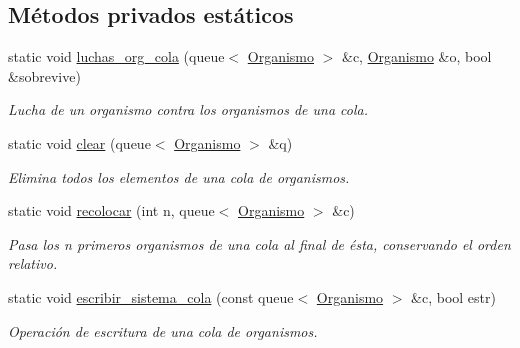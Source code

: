 \subsection*{\-Métodos privados estáticos}
\begin{DoxyCompactItemize}
\item 
static void \hyperlink{class_sistema_a9123a18225eece5cf29d0d59067ac509}{luchas\-\_\-org\-\_\-cola} (queue$<$ \hyperlink{class_organismo}{\-Organismo} $>$ \&c, \hyperlink{class_organismo}{\-Organismo} \&o, bool \&sobrevive)
\begin{DoxyCompactList}\small\item\em \-Lucha de un organismo contra los organismos de una cola. \end{DoxyCompactList}\item 
static void \hyperlink{class_sistema_afaa4f1c2cce4c63faf03ee01265f5320}{clear} (queue$<$ \hyperlink{class_organismo}{\-Organismo} $>$ \&q)
\begin{DoxyCompactList}\small\item\em \-Elimina todos los elementos de una cola de organismos. \end{DoxyCompactList}\item 
static void \hyperlink{class_sistema_a251ac725ddac0022e4845faec14004ef}{recolocar} (int n, queue$<$ \hyperlink{class_organismo}{\-Organismo} $>$ \&c)
\begin{DoxyCompactList}\small\item\em \-Pasa los n primeros organismos de una cola al final de ésta, conservando el orden relativo. \end{DoxyCompactList}\item 
static void \hyperlink{class_sistema_aa5e14a3c6ccd53bf61020d69e03b136d}{escribir\-\_\-sistema\-\_\-cola} (const queue$<$ \hyperlink{class_organismo}{\-Organismo} $>$ \&c, bool estr)
\begin{DoxyCompactList}\small\item\em \-Operación de escritura de una cola de organismos. \end{DoxyCompactList}\end{DoxyCompactItemize}
